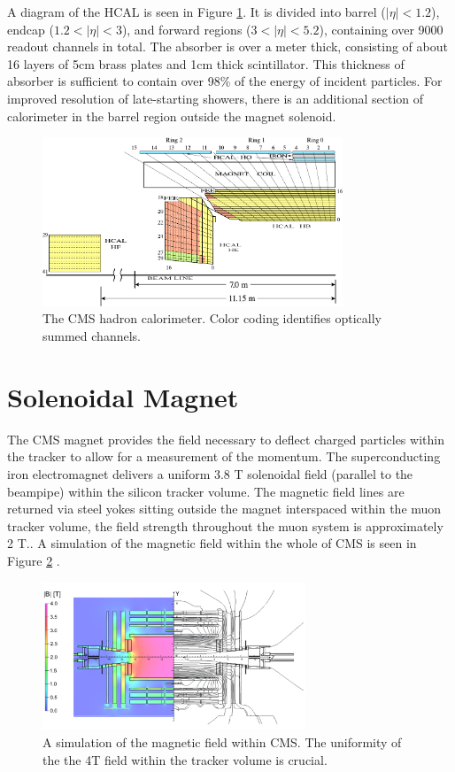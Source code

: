 A diagram of the HCAL is seen in Figure \ref{fig:hcal}. It is divided into barrel ($|\eta|<1.2$), endcap ($1.2<|\eta|<3$), and forward regions ($3<|\eta|<5.2$), containing over 9000 readout channels in total. The absorber is over a meter thick, consisting of about 16 layers of 5cm brass plates and 1cm thick scintillator. This thickness of absorber is sufficient to contain over 98\% of the energy of incident particles. For improved resolution of late-starting showers, there is an additional section of calorimeter in the barrel region outside the magnet solenoid.

\begin{figure}[hb!]
\centering
\includegraphics[width=0.8\textwidth]{figs/hcal.pdf}
\caption{The CMS hadron calorimeter. Color coding identifies optically summed channels.\cite{cosmichcal}}
\label{fig:hcal}
\end{figure}

\section{Solenoidal Magnet}

The CMS magnet provides the field necessary to deflect charged particles within the tracker to allow for a measurement of the momentum. The superconducting iron electromagnet delivers a uniform 3.8 T solenoidal field (parallel to the beampipe) within the silicon tracker volume. The magnetic field lines are returned via steel yokes sitting outside the magnet interspaced within the muon tracker volume, the field strength throughout the muon system is approximately 2 T.\cite{magnettdr}. A simulation of the magnetic field within the whole of CMS is seen in Figure \ref{fig:magnet} \cite{magnet}.

\begin{figure}[hb!]
\centering
\includegraphics[width=0.7\textwidth]{figs/magnet.png}
\caption{A simulation of the magnetic field within CMS. The uniformity of the the 4T field within the tracker volume is crucial.}
\label{fig:magnet}
\end{figure}

